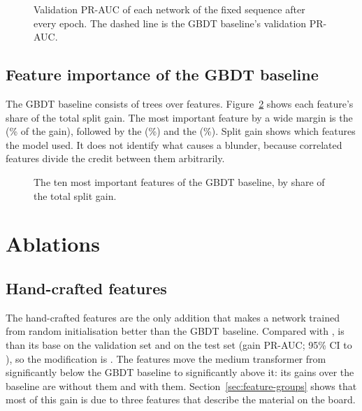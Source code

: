 \documentclass[11pt]{article}
\begin{document}
\begin{figure}[htbp]\centering
{}
\caption{Validation PR-AUC of each network of the fixed sequence after every
epoch. The dashed line is the GBDT baseline's validation PR-AUC.}
\label{fig:curves}
\end{figure}

\subsection{Feature importance of the GBDT baseline}

The GBDT baseline consists of  trees over
 features. Figure~\ref{fig:leans} shows each feature's
share of the total split gain. The most important feature by a wide margin is
the  (\% of the
gain), followed by the 
(\%) and the 
(\%). Split gain shows which features the model
used. It does not identify what causes a blunder, because correlated features
divide the credit between them arbitrarily.

\begin{figure}[htbp]\centering
{}
\caption{The ten most important features of the GBDT baseline, by share of
the total split gain.}
\label{fig:leans}
\end{figure}

\ifchanges
\section{Ablations}
\label{sec:ablations}



\ifchangehand
\subsection{Hand-crafted features}

The hand-crafted features are the only addition that makes a network trained
from random initialisation better than the GBDT baseline. Compared with
,  is
 than its
base on the validation set and
 on the test set
(gain  PR-AUC; 95\%
CI  to
), so the
modification is . The
features move the medium transformer from significantly below the GBDT
baseline to significantly above it: its gains over the baseline are
 without them and
 with them.
\iffeatures
Section~\ref{sec:feature-groups} shows that most of this gain is due to three
features that describe the material on the board.
\fi
\fi
\end{document}
